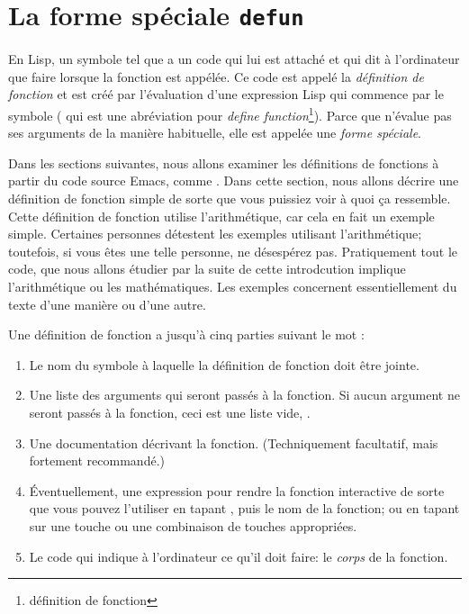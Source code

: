 \section{La forme spéciale \texttt{defun}}

En Lisp, un symbole tel que  a un code qui lui
est attaché et qui dit à l'ordinateur que faire lorsque la fonction
est appélée. Ce code est appelé la \textit{définition de fonction} et est
créé par l'évaluation d'une expression Lisp qui commence par le
symbole  ( qui est une abréviation pour \textit{define
  function}\footnote{définition de fonction}). Parce que 
n'évalue pas ses arguments de la manière habituelle, elle est appelée
une \textit{forme spéciale}.

Dans les sections suivantes, nous allons examiner les définitions de
fonctions à partir du code source Emacs, comme
. Dans cette section, nous allons décrire une
définition de fonction simple de sorte que vous puissiez voir à quoi
ça ressemble. Cette définition de fonction utilise l'arithmétique, car
cela en fait un exemple simple. Certaines personnes détestent les
exemples utilisant l'arithmétique; toutefois, si vous êtes une telle
personne, ne désespérez pas. Pratiquement tout le code, que nous
allons étudier par la suite de cette introdcution implique
l'arithmétique ou les mathématiques. Les exemples concernent
essentiellement du texte d'une manière ou d'une autre.

Une définition de fonction a jusqu'à cinq parties suivant le mot
 :
\begin{enumerate}
\item Le nom du symbole à laquelle la définition de fonction doit être
  jointe.
\item Une liste des arguments qui seront passés à la fonction. Si
  aucun argument ne seront passés à la fonction, ceci est une liste
  vide, \tm{()}.
\item Une documentation décrivant la fonction. (Techniquement
  facultatif, mais fortement recommandé.)
\item \'Eventuellement, une expression pour rendre la fonction
  interactive de sorte que vous pouvez l'utiliser en tapant ,
  puis le nom de la fonction; ou en tapant sur une touche ou une
  combinaison de touches appropriées.
\item Le code qui indique à l'ordinateur ce qu'il doit faire: le
  \textit{corps} de la fonction.
\end{enumerate}

